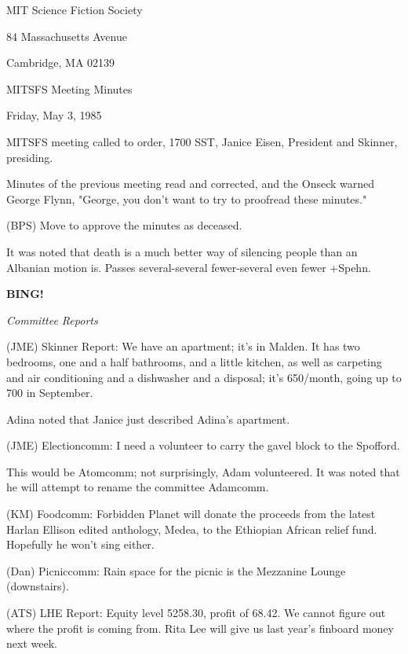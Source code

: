 \documentclass[12pt]{article}
\newcommand{\bing}{{\bf BING!} }
\newcommand{\goto}[1]{\bing \vskip 12pt \centerline{{\em{#1}}}}
\begin{document}
\begin{center}

MIT Science Fiction Society 

84 Massachusetts Avenue

Cambridge, MA 02139

\vspace{12pt}

MITSFS Meeting Minutes 

Friday, May 3, 1985

\end{center}
 
\vspace{18pt}

\setlength{\parskip}{6pt}

\noindent
MITSFS meeting called to order, 1700 SST,
Janice Eisen, President and Skinner, presiding.

Minutes of the previous meeting read and corrected, and the Onseck warned George Flynn, "George, you don't want to try to proofread these minutes."

(BPS) Move to approve the minutes as deceased.

It was noted that death is a much better way of silencing people than an Albanian motion is. Passes several-several fewer-several even fewer +Spehn.

\goto{Committee Reports}

(JME) Skinner Report: We have an apartment; it's in Malden. It has two bedrooms, one and a half bathrooms, and a little kitchen, as well as carpeting and air conditioning and a dishwasher and a disposal; it's 650/month, going up to 700 in September.

Adina noted that Janice just described Adina's apartment.

(JME) Electioncomm: I need a volunteer to carry the gavel block to the Spofford.

This would be Atomcomm; not surprisingly, Adam volunteered. It was noted that he will attempt to rename the committee Adamcomm.

(KM) Foodcomm: Forbidden Planet will donate the proceeds from the latest Harlan Ellison edited anthology, Medea, to the Ethiopian African relief fund. Hopefully he won't sing either.

(Dan) Picniccomm: Rain space for the picnic is the Mezzanine Lounge (downstairs).

(ATS) LHE Report: Equity level 5258.30, profit of 68.42. We cannot figure out where the profit is coming from. Rita Lee will give us last year's finboard money next week.
\end{document}
